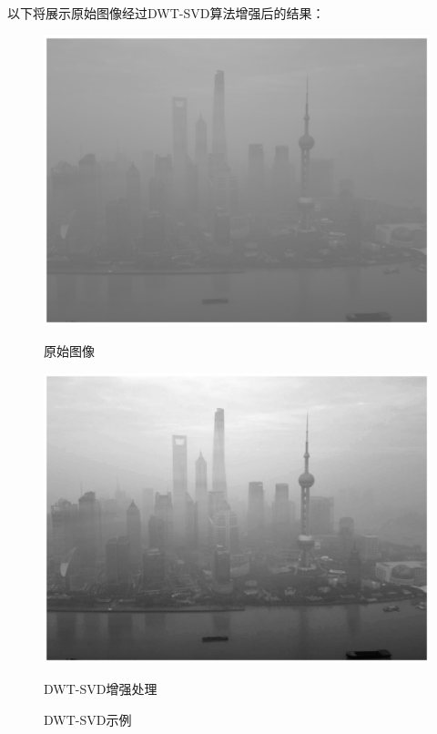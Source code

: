 \documentclass[12pt]{book}
\begin{document}
以下将展示原始图像经过DWT-SVD算法增强后的结果：
				\begin{figure}[ht]
					\begin{minipage}{0.48\linewidth}
						\centerline{\includegraphics[width=1\textwidth]{./figures/originalImage.eps}}
						\centerline{原始图像}
					\end{minipage}
					\qquad
					\begin{minipage}{0.48\linewidth}
						\centerline{\includegraphics[width=1\textwidth]{./figures/DWTSVDExample.eps}}
						\centerline{DWT-SVD增强处理}
					\end{minipage}
					\caption{DWT-SVD示例\label{DWT}}
				\end{figure}
\end{document}
